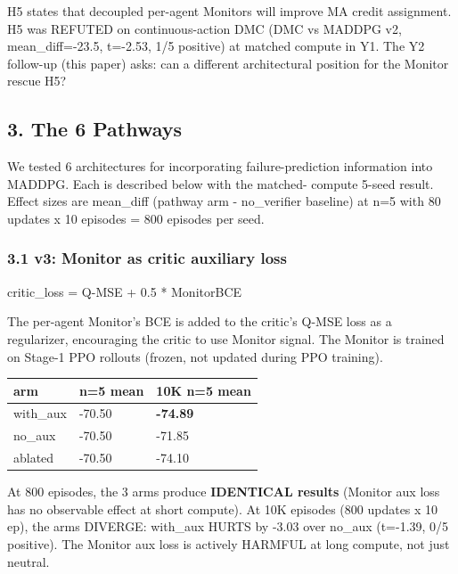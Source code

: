\documentclass[
]{article}
\newenvironment{Shaded}{}{}
\newcommand{\FloatTok}[1]{\textcolor[rgb]{0.25,0.63,0.44}{#1}}
\newcommand{\NormalTok}[1]{#1}
\newcommand{\OperatorTok}[1]{\textcolor[rgb]{0.40,0.40,0.40}{#1}}
\newcounter{none} %
\begin{document}
H5 states that decoupled per-agent Monitors will improve MA credit
assignment. H5 was REFUTED on continuous-action DMC (DMC vs MADDPG v2,
mean\_diff=-23.5, t=-2.53, 1/5 positive) at matched compute in Y1. The
Y2 follow-up (this paper) asks: can a different architectural position
for the Monitor rescue H5?

\subsection{3. The 6 Pathways}\label{the-6-pathways}

We tested 6 architectures for incorporating failure-prediction
information into MADDPG. Each is described below with the matched-
compute 5-seed result. Effect sizes are mean\_diff (pathway arm -
no\_verifier baseline) at n=5 with 80 updates x 10 episodes = 800
episodes per seed.

\subsubsection{3.1 v3: Monitor as critic auxiliary
loss}\label{v3-monitor-as-critic-auxiliary-loss}

\begin{Shaded}
\begin{Highlighting}[]
\NormalTok{critic\_loss }\OperatorTok{=}\NormalTok{ Q}\OperatorTok{{-}}\NormalTok{MSE }\OperatorTok{+} \FloatTok{0.5} \OperatorTok{*}\NormalTok{ MonitorBCE}
\end{Highlighting}
\end{Shaded}

The per-agent Monitor's BCE is added to the critic's Q-MSE loss as a
regularizer, encouraging the critic to use Monitor signal. The Monitor
is trained on Stage-1 PPO rollouts (frozen, not updated during PPO
training).

{\def\LTcaptype{none} %
\begin{longtable}[]{@{}lll@{}}
\toprule\noalign{}
arm & n=5 mean & 10K n=5 mean \\
\midrule\noalign{}
\endhead
\bottomrule\noalign{}
\endlastfoot
with\_aux & -70.50 & \textbf{-74.89} \\
no\_aux & -70.50 & -71.85 \\
ablated & -70.50 & -74.10 \\
\end{longtable}
}

At 800 episodes, the 3 arms produce \textbf{IDENTICAL results} (Monitor
aux loss has no observable effect at short compute). At 10K episodes
(800 updates x 10 ep), the arms DIVERGE: with\_aux HURTS by -3.03 over
no\_aux (t=-1.39, 0/5 positive). The Monitor aux loss is actively
HARMFUL at long compute, not just neutral.
\end{document}
